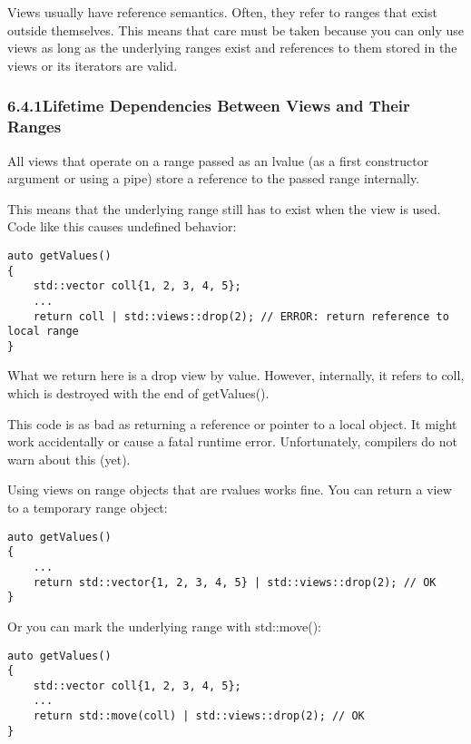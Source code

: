 
Views usually have reference semantics. Often, they refer to ranges that exist outside themselves. This means that care must be taken because you can only use views as long as the underlying ranges exist and references to them stored in the views or its iterators are valid.

\subsubsection*{ 6.4.1\hspace{0.2cm}Lifetime Dependencies Between Views and Their Ranges}

All views that operate on a range passed as an lvalue (as a first constructor argument or using a pipe) store a reference to the passed range internally.

This means that the underlying range still has to exist when the view is used. Code like this causes undefined behavior:

\begin{lstlisting}[style=styleCXX]
auto getValues()
{
	std::vector coll{1, 2, 3, 4, 5};
	...
	return coll | std::views::drop(2); // ERROR: return reference to local range
}
\end{lstlisting}

What we return here is a drop view by value. However, internally, it refers to coll, which is destroyed with the end of getValues().

This code is as bad as returning a reference or pointer to a local object. It might work accidentally or cause a fatal runtime error. Unfortunately, compilers do not warn about this (yet).

Using views on range objects that are rvalues works fine. You can return a view to a temporary range object:

\begin{lstlisting}[style=styleCXX]
auto getValues()
{
	...
	return std::vector{1, 2, 3, 4, 5} | std::views::drop(2); // OK
}
\end{lstlisting}

Or you can mark the underlying range with std::move():

\begin{lstlisting}[style=styleCXX]
auto getValues()
{
	std::vector coll{1, 2, 3, 4, 5};
	...
	return std::move(coll) | std::views::drop(2); // OK
}
\end{lstlisting}

